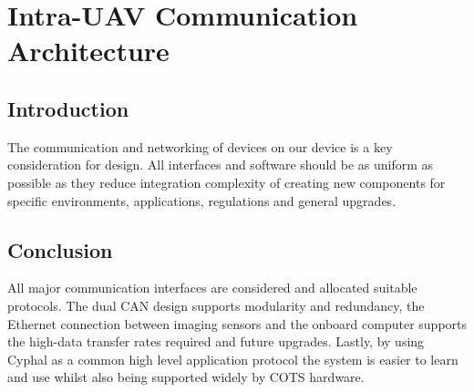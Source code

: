 \newpage
{}
\section{Intra-UAV Communication Architecture} \label{Intra Communication}

\subsection{Introduction}\label{sub_section:tgt_intra_com_intro}
The communication and networking of devices on our device is a key consideration for design. All interfaces and software should be as uniform as possible as they reduce integration complexity of creating new components for specific environments, applications, regulations and general upgrades.



\subsection{Conclusion}
All major communication interfaces are considered and allocated suitable protocols. The dual \gls{CAN} design supports modularity and redundancy, the Ethernet connection between imaging sensors and the onboard computer supports the high-data transfer rates required and future upgrades. Lastly, by using Cyphal as a common high level application protocol the system is easier to learn and use whilst also being supported widely by \gls{COTS} hardware.